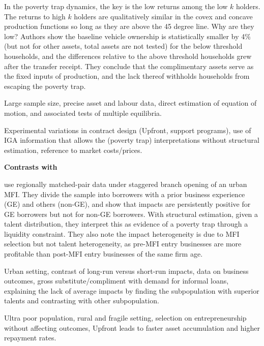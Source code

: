 	In the poverty trap dynamics, the key is the low returns among the low $k$ holders. The returns to high $k$ holders are qualitatively similar in the covex and concave production functions so long as they are above the 45 degree line. Why are they low? Authors show the baseline vehicle ownership is statistically smaller by 4\% (but not for other assets, total assets are not tested) for the below threshold households, and the differences relative to the above threshold households grew after the transfer receipt. They conclude that the complimentary assets serve as the fixed inputs of production, and the lack thereof withholds households from escaping the poverty trap.

\begin{description}
\vspace{1.0ex}\setlength{\itemsep}{1.0ex}\setlength{\baselineskip}{12pt}
\item[their strength]	Large sample size, precise asset and labour data, direct estimation of equation of motion, and associated tests of multiple equilibria.
\item[our strength]	Experimental variations in contract design (\textsf{Upfront}, support programs), use of IGA information that allows the (poverty trap) interpretations without structural estimation, reference to market costs/prices. 
\end{description}

\noindent
\textbf{\textbf{Contrasts with \citet{Banerjee2019MFPovertyTrap}}}

	\citet{Banerjee2019MFPovertyTrap} use regionally matched-pair data under staggered branch opening of an urban MFI. They divide the sample into borrowers with a prior business experience (GE) and others (non-GE), and show that impacts are persistently positive for GE borrowers but not for non-GE borrowers. With structural estimation, given a talent distribution, they interpret this as evidence of a poverty trap through a liquidity constraint. They also note the impact heterogeneity is due to MFI selection but not talent heterogeneity, as pre-MFI entry businesses are more profitable than post-MFI entry businesses of the same firm age. 

\begin{description}
\vspace{1.0ex}\setlength{\itemsep}{1.0ex}\setlength{\baselineskip}{12pt}
\item[their strength]	Urban setting, contrast of long-run versus short-run impacts, data on business outcomes, gross substitute/compliment with demand for informal loans, explaining the lack of average impacts by finding the subpopulation with superior talents and contrasting with other subpopulation.
\item[our strength]	Ultra poor population, rural and fragile setting, selection on entrepreneurship without affecting outcomes, \textsf{Upfront} leads to faster asset accumulation and higher repayment rates.
\end{description}

